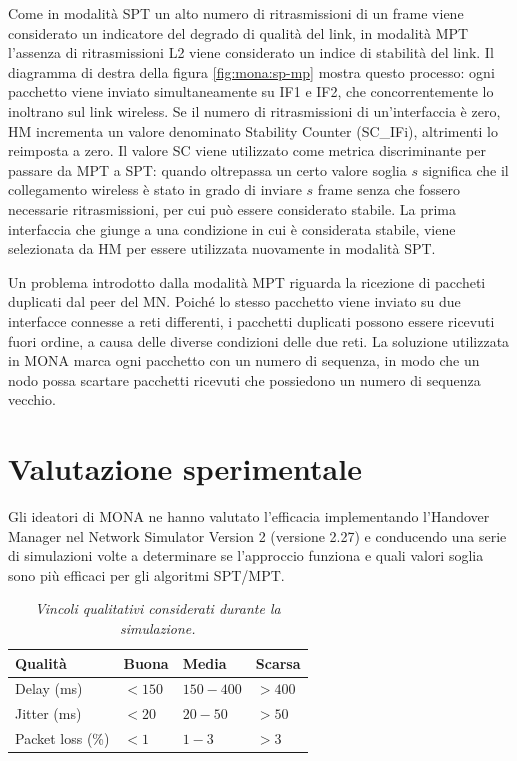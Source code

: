 \documentclass[12pt,a4paper,openright,twoside]{book}
\begin{document}
Come in modalità SPT un alto numero di ritrasmissioni di un frame
viene considerato un indicatore del degrado di qualità del link, in
modalità MPT l'assenza di ritrasmissioni L2 viene considerato un
indice di stabilità del link. Il diagramma di destra della figura
\ref{fig:mona:sp-mp} mostra questo processo: ogni pacchetto viene
inviato simultaneamente su IF1 e IF2, che concorrentemente lo
inoltrano sul link wireless. Se il numero di ritrasmissioni di
un'interfaccia è zero, HM incrementa un valore denominato Stability
Counter (SC\_IFi), altrimenti lo reimposta a zero. Il valore SC viene
utilizzato come metrica discriminante per passare da MPT a SPT: quando
oltrepassa un certo valore soglia $s$ significa che il collegamento
wireless è stato in grado di inviare $s$ frame senza che fossero
necessarie ritrasmissioni, per cui può essere considerato stabile. La
prima interfaccia che giunge a una condizione in cui è considerata
stabile, viene selezionata da HM per essere utilizzata nuovamente in
modalità SPT.

Un problema introdotto dalla modalità MPT riguarda la ricezione di
paccheti duplicati dal peer del MN. Poiché lo stesso pacchetto viene
inviato su due interfacce connesse a reti differenti, i pacchetti
duplicati possono essere ricevuti fuori ordine, a causa delle diverse
condizioni delle due reti. La soluzione utilizzata in MONA marca ogni
pacchetto con un numero di sequenza, in modo che un nodo possa
scartare pacchetti ricevuti che possiedono un numero di sequenza
vecchio.

\section{Valutazione sperimentale}

Gli ideatori di MONA ne hanno valutato l'efficacia implementando
l'Handover Manager nel Network Simulator Version 2 \cite{bib:ns-2}
(versione 2.27) e conducendo una serie di simulazioni volte a
determinare se l'approccio funziona e quali valori soglia sono più
efficaci per gli algoritmi SPT/MPT.

\begin{table}
  \centering
  \begin{tabular}[bt]{|llll|}
    \hline
    Qualità & Buona & Media & Scarsa         \\
    \hline
    Delay (ms) & $<150$ & $150-400$ & $>400$ \\
    Jitter (ms) & $<20$ & $20-50$ & $>50$    \\
    Packet loss (\%) & $<1$ & $1-3$ & $>3$   \\
    \hline
  \end{tabular}
  \caption{\em Vincoli qualitativi considerati durante la simulazione.}
  \label{tab:mona:vincoli}
\end{table}
\end{document}
